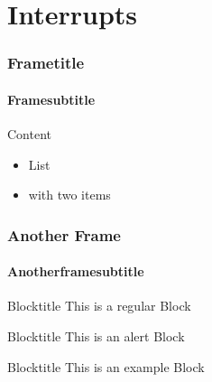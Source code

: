 \section{Interrupts}
\begin{frame}
    \frametitle{Frametitle}
    \framesubtitle{Framesubtitle}
    Content
    \begin{itemize}
        \item List
        \item with two items
    \end{itemize}
\end{frame}
\begin{frame}
    \frametitle{Another Frame}
    \framesubtitle{Anotherframesubtitle}
    \begin{block}{Blocktitle}
        This is a regular Block
    \end{block}
    \begin{alertblock}{Blocktitle}
        This is an alert Block
    \end{alertblock}
    \begin{exampleblock}{Blocktitle}
        This is an example Block
    \end{exampleblock}
\end{frame}
